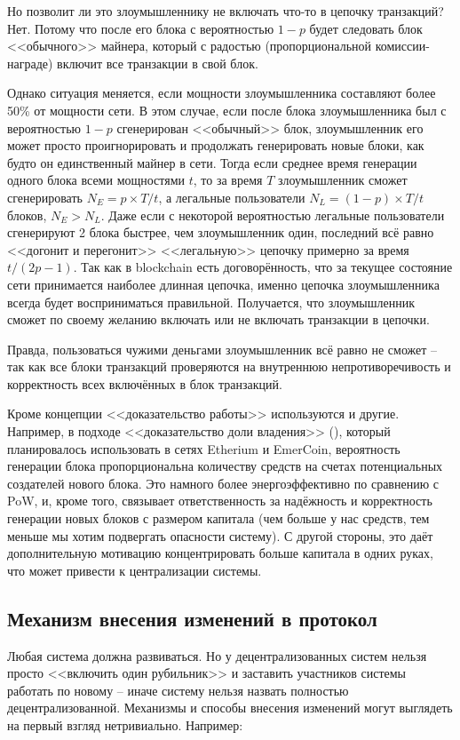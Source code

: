 Но позволит ли это злоумышленнику не включать что-то в цепочку транзакций? Нет. Потому что после его блока с вероятностью $1 - p$ будет следовать блок <<обычного>> майнера, который с радостью (пропорциональной комиссии-награде) включит все транзакции в свой блок.

Однако ситуация меняется, если мощности злоумышленника составляют более 50\% от мощности сети. В этом случае, если после блока злоумышленника был с вероятностью $1 - p$ сгенерирован <<обычный>> блок, злоумышленник его может просто проигнорировать и продолжать генерировать новые блоки, как будто он единственный майнер в сети. Тогда если среднее время генерации одного блока всеми мощностями $t$, то за время $T$ злоумышленник сможет сгенерировать $N_E = p \times T / t$, а легальные пользователи $N_L = (1 - p) \times T / t$ блоков, $N_E > N_L$. Даже если с некоторой вероятностью легальные пользователи сгенерируют 2 блока быстрее, чем злоумышленник один, последний всё равно <<догонит и перегонит>> <<легальную>> цепочку примерно за время $t / (2p - 1)$. Так как в blockchain есть договорённость, что за текущее состояние сети принимается наиболее длинная цепочка, именно цепочка злоумышленника всегда будет восприниматься правильной. Получается, что злоумышленник сможет по своему желанию включать или не включать транзакции в цепочки.

Правда, пользоваться чужими деньгами злоумышленник всё равно не сможет -- так как все блоки транзакций проверяются на внутреннюю непротиворечивость и корректность всех включённых в блок транзакций.

Кроме концепции <<доказательство работы>> используются и другие. Например, в подходе <<доказательство доли владения>> (), который планировалось использовать в сетях Etherium и EmerCoin, вероятность генерации блока пропорциональна количеству средств на счетах потенциальных создателей нового блока. Это намного более энергоэффективно по сравнению с PoW, и, кроме того, связывает ответственность за надёжность и корректность генерации новых блоков с размером капитала (чем больше у нас средств, тем меньше мы хотим подвергать опасности систему). С другой стороны, это даёт дополнительную мотивацию концентрировать больше капитала в одних руках, что может привести к централизации системы.

\subsection{Механизм внесения изменений в протокол}
Любая система должна развиваться. Но у децентрализованных систем нельзя просто <<включить один рубильник>> и заставить участников системы работать по новому -- иначе систему нельзя назвать полностью децентрализованной. Механизмы и способы внесения изменений могут выглядеть на первый взгляд нетривиально. Например:

